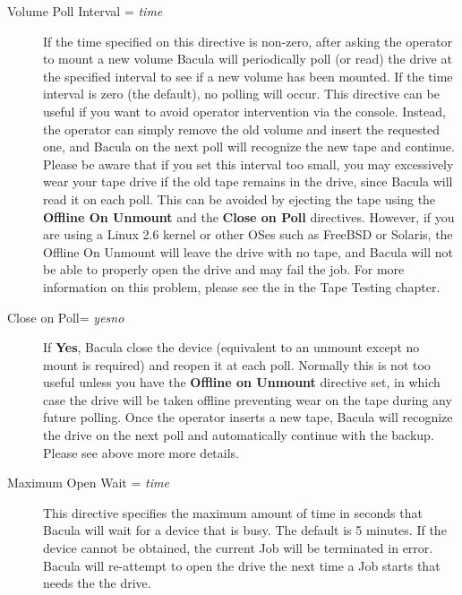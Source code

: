 \begin{description}
\item [Volume Poll Interval = {\it time}]
   If the time  specified on this directive is non-zero, after  asking the
   operator to mount a new volume Bacula will  periodically poll (or read) the
   drive at the specified  interval to see if a new volume has been mounted. If
   the  time interval is zero (the default), no polling will occur.  This
   directive can be useful if you want to avoid operator  intervention via the
   console. Instead, the operator can  simply remove the old volume and insert
   the requested one,  and Bacula on the next poll will recognize the new tape
   and  continue. Please be aware that if you set this interval  too small, you
   may excessively wear your tape drive if the  old tape remains in the drive,
   since Bacula will read it on  each poll. This can be avoided by ejecting the
   tape using  the {\bf Offline On Unmount} and the {\bf Close on Poll} 
   directives. 
   However, if you are using a Linux 2.6 kernel or other OSes
   such as FreeBSD or Solaris, the Offline On Unmount will leave the drive
   with no tape, and Bacula will not be able to properly open the drive and
   may fail the job.  For more information on this problem, please see the
    in the Tape
   Testing chapter.

\item [Close on Poll= {\it yes\vb{}no}]
   If {\bf Yes}, Bacula close the device (equivalent to  an unmount except no
   mount is required) and reopen it at each  poll. Normally this is not too
   useful unless you have the  {\bf Offline on Unmount} directive set, in which
   case the  drive will be taken offline preventing wear on the tape  during any
   future polling. Once the operator inserts a new  tape, Bacula will recognize
   the drive on the next poll and  automatically continue with the backup. 
   Please see above more more details.

\item [Maximum Open Wait = {\it time}]
   This directive specifies the maximum amount of time in seconds that
   Bacula will wait for a device that is busy.  The default is 5 minutes.
   If the device cannot be obtained, the current Job will be terminated in
   error.  Bacula will re-attempt to open the drive the next time a Job
   starts that needs the the drive.


\end{description}
